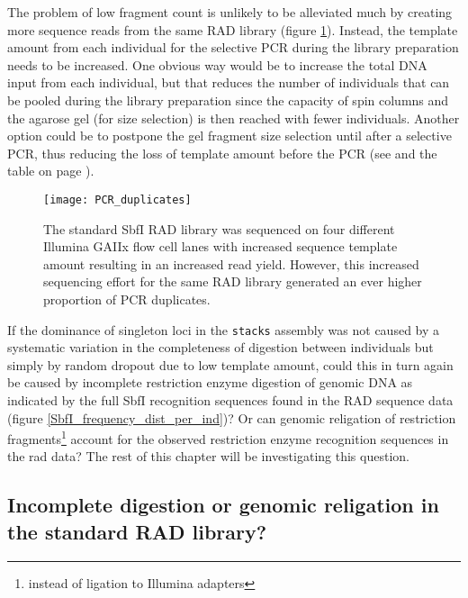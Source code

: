 \documentclass[a4paper,12pt,times,authoryear,twoside,print,index]{Classes/PhDThesisPSnPDF}\usepackage[]{graphicx}\usepackage[]{color}
\begin{document}
The problem of low \gls{fragment} count is unlikely to be alleviated much by creating more sequence reads from the same RAD library (figure \ref{PCRduplicates}). Instead, the template amount from each individual for the selective PCR during the library preparation needs to be increased. One obvious way would be to increase the total DNA input from each individual, but that reduces the number of individuals that can be pooled during the library preparation since the capacity of spin columns and the agarose gel (for size selection) is then reached with fewer individuals. Another option could be to postpone the gel fragment size selection until after a selective PCR, thus reducing the loss of template amount before the PCR (see \citealt{Parchman2012} and the table on page \pageref{compProt}).
%
\begin{figure}
\centering
\texttt{[image: PCR\_duplicates]}
\caption{The standard SbfI RAD library was sequenced on four different Illumina GAIIx flow cell lanes with increased sequence template amount resulting in an increased read yield. However, this increased sequencing effort for the same RAD library generated an ever higher proportion of PCR duplicates.}
\label{PCRduplicates}
\end{figure}

If the dominance of singleton loci in the \texttt{stacks} assembly was not caused by a systematic variation in the completeness of digestion between individuals but simply by random dropout due to low template amount, could this in turn again be caused by incomplete restriction enzyme digestion of genomic DNA as indicated by the full \gls{SbfI} recognition sequences found in the RAD sequence data (figure \ref{SbfI_frequency_dist_per_ind})? Or can genomic religation of restriction fragments\footnote{instead of ligation to Illumina adapters} account for the observed restriction enzyme recognition sequences in the \gls{rad} data?  The rest of this chapter will be investigating this question.


\FloatBarrier
\subsection{Incomplete digestion or genomic religation in the standard RAD library?}
\end{document}
